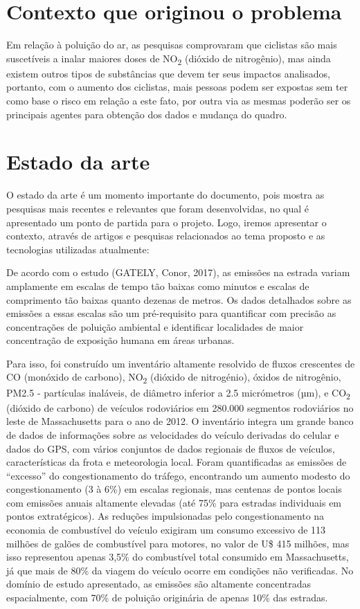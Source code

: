 \section{Contexto que originou o problema}

Em relação à poluição do ar, as pesquisas comprovaram que ciclistas são mais suscetíveis a inalar 
maiores doses de NO\textsubscript{2} (dióxido de nitrogênio), mas ainda existem outros tipos de 
substâncias que devem ter seus impactos analisados, portanto, com o aumento dos ciclistas, mais 
pessoas podem ser expostas sem ter como base o risco em relação a este fato, por outra via as mesmas 
poderão ser os principais agentes para obtenção dos dados e mudança do quadro.


\section{Estado da arte}

O estado da arte é um momento importante do documento, pois mostra as pesquisas mais recentes e 
relevantes que foram desenvolvidas, no qual é apresentado um ponto de partida para o projeto. Logo, 
iremos apresentar o contexto, através de artigos e pesquisas relacionados ao tema proposto e as 
tecnologias utilizadas atualmente:

De acordo com o estudo (GATELY, Conor, 2017), as emissões na estrada variam amplamente em escalas de 
tempo tão baixas como minutos e escalas de comprimento tão baixas quanto dezenas de metros. Os dados 
detalhados sobre as emissões a essas escalas são um pré-requisito para quantificar com precisão as 
concentrações de poluição ambiental e identificar localidades de maior concentração de exposição 
humana em áreas urbanas.

Para isso, foi construído um inventário altamente resolvido de fluxos crescentes de CO (monóxido de 
carbono), NO\textsubscript{2} (dióxido de nitrogénio), óxidos de nitrogênio, PM2.5 - partículas 
inaláveis, de diâmetro inferior a 2.5 micrómetros (µm), e CO\textsubscript{2} (dióxido de carbono) 
de veículos rodoviários em 280.000 segmentos rodoviários no leste de Massachusetts para o ano de 
2012. O inventário integra um grande banco de dados de informações sobre as velocidades do veículo 
derivadas do celular e dados do GPS, com vários conjuntos de dados regionais de fluxos de veículos, 
características da frota e meteorologia local. Foram quantificadas as emissões de ``excesso'' do 
congestionamento do tráfego, encontrando um aumento modesto do congestionamento (3 à 6\%) em escalas 
regionais, mas centenas de pontos locais com emissões anuais altamente elevadas (até 75\% para 
estradas individuais em pontos extratégicos). As reduções impulsionadas pelo congestionamento na 
economia de combustível do veículo exigiram um consumo excessivo de 113 milhões de galões de 
combustível para motores, no valor de U\$ 415 milhões, mas isso representou apenas 3,5\% do 
combustível total consumido em Massachusetts, já que mais de 80\% da viagem do veículo ocorre em 
condições não verificadas. No domínio de estudo apresentado, as emissões são altamente concentradas 
espacialmente, com 70\% de poluição originária de apenas 10\% das estradas. 

